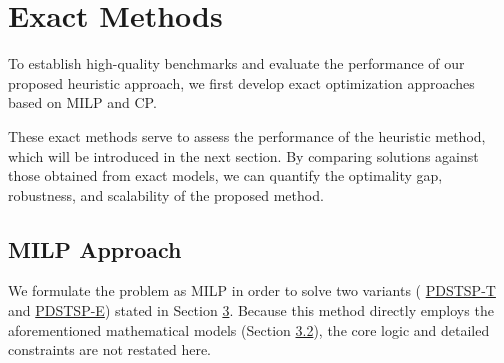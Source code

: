 \documentclass[3p, authoryear, 11pt]{elsarticle}
\begin{document}
\section{Exact Methods}
\label{sec:exact_methods}

To establish high-quality benchmarks and evaluate the performance of our proposed heuristic approach, we first develop exact optimization approaches based on MILP and CP.

These exact methods serve to assess the performance of the heuristic method, which will be introduced in the next section. By comparing solutions against those obtained from exact models,  we can quantify the optimality gap, robustness, and scalability of the proposed method.

\subsection{MILP Approach}
\label{sec:milp_des}

We formulate the problem as MILP in order to solve two variants ( \hyperref[sec:time_model_des]{PDSTSP-T} and \hyperref[sec:energy_model_des]{PDSTSP-E}) stated in Section \hyperref[sec:problem_description]{3}. 
Because this method directly employs the aforementioned mathematical models (Section \hyperref[sec:model_formulation_math]{3.2}), the core logic and detailed constraints are not restated here.






\end{document}
